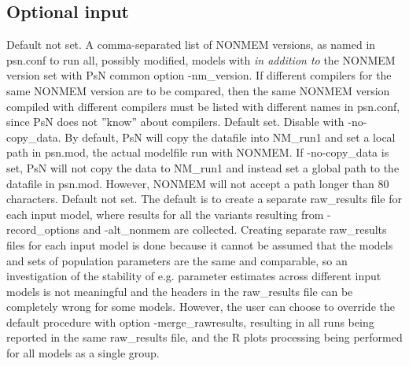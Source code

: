 			\subsection{Optional input}
			\begin{optionlist}
			Default not set. 
			A comma-separated list of NONMEM versions, as named in psn.conf to run all, possibly modified, models with
			\emph{in addition to} the NONMEM version set with PsN common option -nm\_version.
			If different compilers for the same NONMEM version are to be compared, 
			then the same NONMEM version compiled with different compilers
			must be listed with different names in psn.conf, since PsN does not ''know'' about compilers.
			\nextopt
			Default set. Disable with -no-copy\_data. By default, PsN will copy the datafile into NM\_run1 and set a 
			local path in psn.mod, the actual modelfile run with NONMEM. If -no-copy\_data is set, PsN will not copy 
			the data to NM\_run1 and instead set a global path to the datafile in psn.mod. However, NONMEM will not 
			accept a path longer than 80 characters.
			\nextopt
		    \nextopt
			Default not set. The default is to create a separate raw\_results file for each input model,
			where results for all the variants resulting from -record\_options and -alt\_nonmem
			are collected. Creating separate raw\_results files for each input model is done because
			it cannot be assumed that the models and sets of population parameters are the same and comparable,
			so an investigation of the stability of e.g. parameter estimates across different input models
			is not meaningful and the headers in the raw\_results file can be completely wrong for some models. 
			However, the user can choose to override the default procedure
			with option -merge\_rawresults, resulting in all runs being reported in the same raw\_results file,
			and the R plots processing being performed for all models as a single group.

\end{optionlist}
